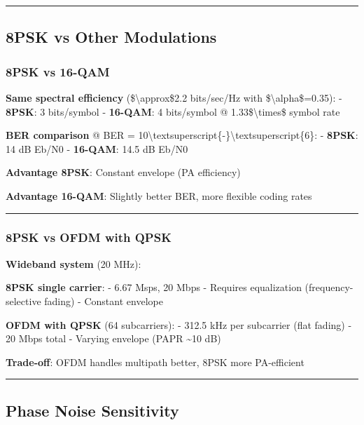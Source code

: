 \begin{center}\rule{0.5\linewidth}{0.5pt}\end{center}

\subsection{8PSK vs Other Modulations}\label{psk-vs-other-modulations}

\subsubsection{8PSK vs 16-QAM}\label{psk-vs-16-qam}

\textbf{Same spectral efficiency} (\$\textbackslash approx\$2.2
bits/sec/Hz with \$\textbackslash alpha\$=0.35): - \textbf{8PSK}: 3
bits/symbol - \textbf{16-QAM}: 4 bits/symbol @
1.33\$\textbackslash times\$ symbol rate

\textbf{BER comparison} @ BER =
10\textbackslash textsuperscript\{-\}\textbackslash textsuperscript\{6\}:
- \textbf{8PSK}: 14 dB Eb/N0 - \textbf{16-QAM}: 14.5 dB Eb/N0

\textbf{Advantage 8PSK}: Constant envelope (PA efficiency)

\textbf{Advantage 16-QAM}: Slightly better BER, more flexible coding
rates

\begin{center}\rule{0.5\linewidth}{0.5pt}\end{center}

\subsubsection{8PSK vs OFDM with QPSK}\label{psk-vs-ofdm-with-qpsk}

\textbf{Wideband system} (20 MHz):

\textbf{8PSK single carrier}: - 6.67 Msps, 20 Mbps - Requires
equalization (frequency-selective fading) - Constant envelope

\textbf{OFDM with QPSK} (64 subcarriers): - 312.5 kHz per subcarrier
(flat fading) - 20 Mbps total - Varying envelope (PAPR \textasciitilde10
dB)

\textbf{Trade-off}: OFDM handles multipath better, 8PSK more
PA-efficient

\begin{center}\rule{0.5\linewidth}{0.5pt}\end{center}

\subsection{Phase Noise Sensitivity}\label{phase-noise-sensitivity}

